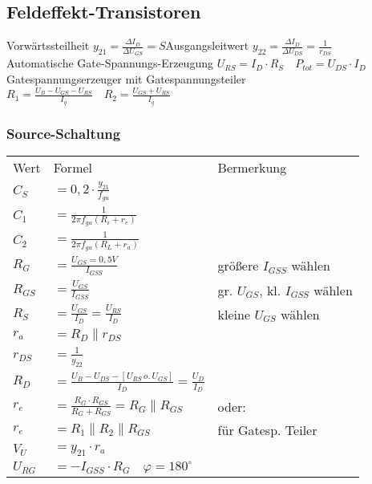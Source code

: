     \subsection{Feldeffekt-Transistoren}
    Vorwärtssteilheit $y_{21}=\frac{\Delta I_D}{\Delta U_{GS}}=S$\quad Ausgangsleitwert $y_{22}=\frac{\Delta I_D}{\Delta U_{DS}}=\frac{1}{r_{DS}}$\\
    Automatische Gate-Spannungs-Erzeugung $U_{RS}=I_D\cdot R_S\quad P_{tot}=U_{DS}\cdot I_D$\\
    Gatespannungserzeuger mit Gatespannungsteiler $R_1=\frac{U_B-U_{GS}-U_{RS}}{I_q}\quad R_2=\frac{U_{GS}+U_{RS}}{I_q}$
    \subsubsection{Source-Schaltung}
    \begin{minipage}{0.5\columnwidth}
        \renewcommand{\arraystretch}{1.01}
        \begin{table}[H]
            \begin{tabularx}{\columnwidth}{l l l}
                Wert & Formel & Bermerkung\\
                $C_S$ & $=0,2\cdot\frac{y_{21}}{f_{gu}}$ & \\ %
                $C_1$ & $=\frac{1}{2\pi f_{gu}(R_i+r_e)}$ & \\
                $C_2$ & $=\frac{1}{2\pi f_{gu}(R_L+r_a)}$ & \\
                $R_G$ & $=\frac{U_{GS}=0,5V}{I_{GSS}}$ & größere $I_{GSS}$ wählen \\
                $R_{GS}$ & $=\frac{U_{GS}}{I_{GSS}}$ & gr. $U_{GS}$, kl. $I_{GSS}$ wählen \\
                $R_S$ & $=\frac{U_{GS}}{I_D}=\frac{U_{RS}}{I_D}$ & kleine $U_{GS}$ wählen \\
                $r_a$ & $=R_D\parallel r_{DS}$ & \\
                $r_{DS}$ & $=\frac{1}{y_{22}}$ & \\
                $R_D$ & $=\frac{U_B-U_{DS}-[U_{RS}\, o.\, U_{GS}]}{I_D}=\frac{U_D}{I_D}$ & \\
                $r_e$ & $=\frac{R_G\cdot R_{GS}}{R_G+R_{GS}}=R_G\parallel R_{GS}$ & oder:\\
                $r_e$ & $=R_1\parallel R_2\parallel R_{GS}$ & für Gatesp. Teiler \\
                $V_U$ & $=y_{21}\cdot r_a$ & \\
                $U_{RG}$ & $=-I_{GSS}\cdot R_G\quad\varphi=180^{\circ}$ & \\ %
            \end{tabularx}
        \end{table}
    \end{minipage}
    \begin{minipage}{0.5\columnwidth}
    \end{minipage}
